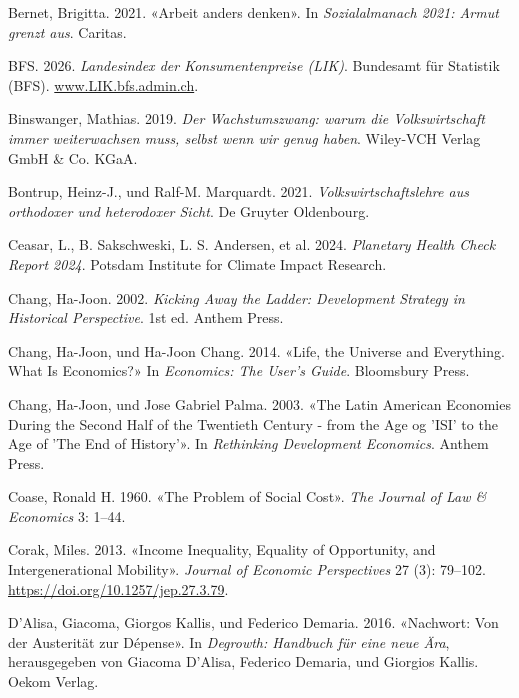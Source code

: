 \documentclass[
  nswissgerman,
  a4paper,
  DIV=11,
  numbers=noendperiod,
  oneside,
  openany]{scrreprt}
\newlength{\cslhangindent}
\newenvironment{CSLReferences}[2] %
 {\begin{list}{}{%
  \setlength{\itemindent}{0pt}
  \setlength{\leftmargin}{0pt}
  \setlength{\parsep}{0pt}
  \ifodd #1
   \setlength{\leftmargin}{\cslhangindent}
   \setlength{\itemindent}{-1\cslhangindent}
  \fi
  \setlength{\itemsep}{#2\baselineskip}}}
 {\end{list}}
\begin{document}
\begin{CSLReferences}{1}{1}
Bernet, Brigitta. 2021. {«Arbeit anders denken»}. In
\emph{Sozialalmanach 2021: Armut grenzt aus}. Caritas.

BFS. 2026. \emph{Landesindex der {Konsumentenpreise} ({LIK})}. Bundesamt
für Statistik (BFS).
\href{https://www.LIK.bfs.admin.ch}{www.LIK.bfs.admin.ch}.

Binswanger, Mathias. 2019. \emph{Der Wachstumszwang: warum die
Volkswirtschaft immer weiterwachsen muss, selbst wenn wir genug haben}.
Wiley-VCH Verlag GmbH \& Co. KGaA.

Bontrup, Heinz-J., und Ralf-M. Marquardt. 2021.
\emph{Volkswirtschaftslehre aus orthodoxer und heterodoxer Sicht}. De
Gruyter Oldenbourg.

Ceasar, L., B. Sakschweski, L. S. Andersen, et al. 2024. \emph{Planetary
Health Check Report 2024}. Potsdam Institute for Climate Impact
Research.

Chang, Ha-Joon. 2002. \emph{Kicking Away the Ladder: Development
Strategy in Historical Perspective}. 1st ed. Anthem Press.

Chang, Ha-Joon, und Ha-Joon Chang. 2014. {«Life, the Universe and
Everything. What Is Economics?»} In \emph{Economics: The User's Guide}.
Bloomsbury Press.

Chang, Ha-Joon, und Jose Gabriel Palma. 2003. {«The Latin American
Economies During the Second Half of the Twentieth Century - from the Age
og 'ISI' to the Age of 'The End of History'»}. In \emph{Rethinking
Development Economics}. Anthem Press.

Coase, Ronald H. 1960. {«The Problem of Social Cost»}. \emph{The Journal
of Law \& Economics} 3: 1--44.

Corak, Miles. 2013. {«Income {Inequality}, {Equality} of {Opportunity},
and {Intergenerational Mobility}»}. \emph{Journal of Economic
Perspectives} 27 (3): 79--102.
\url{https://doi.org/10.1257/jep.27.3.79}.

D'Alisa, Giacoma, Giorgos Kallis, und Federico Demaria. 2016.
{«Nachwort: {Von} der {Austerität} zur {Dépense}»}. In \emph{Degrowth:
{Handbuch} für eine neue Ära}, herausgegeben von Giacoma D'Alisa,
Federico Demaria, und Giorgios Kallis. Oekom Verlag.


\end{CSLReferences}
\end{document}
